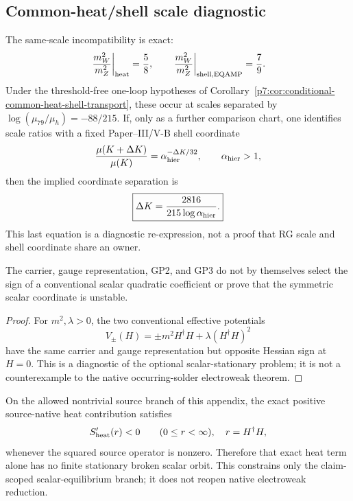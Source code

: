 \documentclass[11pt,a4paper]{article}
\begin{document}
\subsection{Common-heat/shell scale diagnostic}
\label{p7:app:common-heat-shell-scale-diagnostic}
The same-scale incompatibility is exact:
\[
 \left.\frac{m_W^2}{m_Z^2}\right|_{\rm heat}=\frac58,
 \qquad
 \left.\frac{m_W^2}{m_Z^2}\right|_{\rm shell,EQAMP}=\frac79.
\]
Under the threshold-free one-loop hypotheses of
Corollary~\ref{p7:cor:conditional-common-heat-shell-transport}, these occur at
scales separated by \(\log(\mu_{79}/\mu_h)=-88/215\).  If, only as a further
comparison chart, one identifies scale ratios with a fixed Paper--III/V-B
shell coordinate
\[
 \frac{\mu(K+\Delta K)}{\mu(K)}
 =\alpha_{\rm hier}^{-\Delta K/32},
 \qquad \alpha_{\rm hier}>1,
\]
then the implied coordinate separation is
\begin{equation}
 \label{p7:eq:conditional-shell-coordinate-separation}
 \boxed{\Delta K=\frac{2816}{215\log\alpha_{\rm hier}}.}
\end{equation}
This last equation is a diagnostic re-expression, not a proof that RG scale
and shell coordinate share an owner.

\begin{theorem}
\label{p7v2:thm:no-vacuum-selection}
The carrier, gauge representation, GP2, and GP3 do not by themselves select
the sign of a conventional scalar quadratic coefficient or prove that the
symmetric scalar coordinate is unstable.
\end{theorem}
\begin{proof}
For \(m^2,\lambda>0\), the two conventional effective potentials
\[
 V_\pm(H)=\pm m^2H^\dagger H+\lambda(H^\dagger H)^2
\]
have the same carrier and gauge representation but opposite Hessian sign at
\(H=0\).  This is a diagnostic of the optional scalar-stationary problem; it
is not a counterexample to the native occurring-solder electroweak theorem.
\end{proof}

\begin{corollary}
\label{p7v2:cor:native-heat-vacuum-exclusion}
On the allowed nontrivial source branch of this appendix, the exact positive
source-native heat contribution satisfies
\[
 S_{\rm heat}'(r)<0\qquad(0\le r<\infty),\quad r=H^\dagger H,
\]
whenever the squared source operator is nonzero.  Therefore that exact heat
term alone has no finite stationary broken scalar orbit.  This constrains only
the claim-scoped scalar-equilibrium branch; it does not reopen native
electroweak reduction.
\end{corollary}
\end{document}

